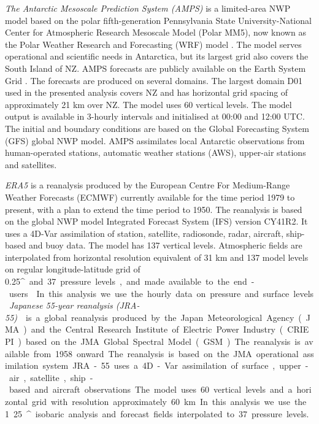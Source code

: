 \textit{The Antarctic Mesoscale Prediction System (AMPS)} \citep{powers2003}
is a limited-area NWP model based on the polar fifth-generation Pennsylvania State
University-National Center for Atmospheric Research Mesoscale Model (Polar MM5),
now known as the Polar Weather Research and Forecasting (WRF) model \citep{hines2008}.
The model serves operational and scientific needs in Antarctica, but its largest grid also covers the South Island of NZ.
AMPS forecasts are publicly available on the Earth System Grid \citep{williams2009}.
The forecasts are produced on several domains. The largest domain D01 used in the presented analysis covers
NZ and has horizontal grid spacing of approximately 21 km over NZ. The model uses 60 vertical levels. The model output is available
in 3-hourly intervals and initialised at 00:00 and 12:00 UTC. The initial and
boundary conditions are based on the Global Forecasting System (GFS) global
NWP model. AMPS assimilates local Antarctic observations from human-operated stations, automatic
weather stations (AWS), upper-air stations and satellites.

\textit{ERA5} \citep{era5} is a reanalysis produced by the European Centre
For Medium-Range Weather Forecasts (ECMWF) currently available for the time
period 1979 to present, with a plan to extend the time period to 1950.
The reanalysis is based on the global NWP model Integrated Forecast System (IFS)
version CY41R2. It uses a 4D-Var assimilation of station, satellite,
radiosonde, radar, aircraft, ship-based and buoy data. The model has 137
vertical levels. Atmospheric fields are interpolated from horizontal resolution
equivalent of 31 km and 137 model levels on regular longitude-latitude grid
of 0.25\unit{^\circ} and 37 pressure levels, and made available to the end-users.
In this analysis we use the hourly data on pressure and surface levels.

\textit{Japanese 55-year reanalysis (JRA-55)} \citep{ebita2011,kobayashi2015,harada2016}
is a global reanalysis produced by the
Japan Meteorological Agency (JMA) and the Central Research Institute of Electric
Power Industry (CRIEPI) based on the JMA Global Spectral Model (GSM).
The reanalysis is available from 1958 onward.
The reanalysis is based on the JMA operational assimilation system.
JRA-55 uses a 4D-Var assimilation of surface, upper-air, satellite, ship-based
and aircraft observations. The model uses 60 vertical levels and a horizontal
grid with resolution approximately 60 km. In this analysis we
use the 1.25\unit{^\circ} isobaric analysis and forecast fields interpolated to
37 pressure levels.

